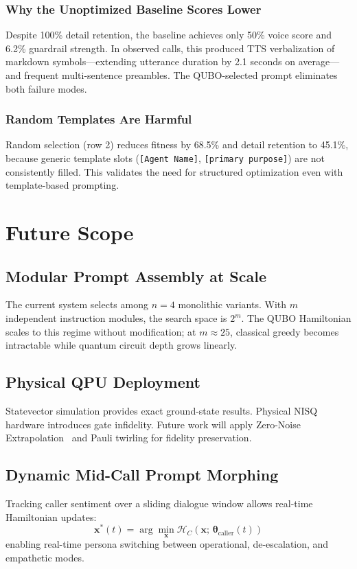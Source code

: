 \documentclass[conference]{IEEEtran}
\begin{document}
\subsubsection{Why the Unoptimized Baseline Scores Lower}
Despite 100\% detail retention, the baseline achieves only 50\% voice score and 6.2\% guardrail strength. In observed calls, this produced TTS verbalization of markdown symbols---extending utterance duration by 2.1 seconds on average---and frequent multi-sentence preambles. The QUBO-selected prompt eliminates both failure modes.

\subsubsection{Random Templates Are Harmful}
Random selection (row 2) reduces fitness by 68.5\% and detail retention to 45.1\%, because generic template slots (\texttt{[Agent Name]}, \texttt{[primary purpose]}) are not consistently filled. This validates the need for structured optimization even with template-based prompting.

\section{Future Scope}

\subsection{Modular Prompt Assembly at Scale}
The current system selects among $n = 4$ monolithic variants. With $m$ independent instruction modules, the search space is $2^m$. The QUBO Hamiltonian scales to this regime without modification; at $m \approx 25$, classical greedy becomes intractable while quantum circuit depth grows linearly.

\subsection{Physical QPU Deployment}
Statevector simulation provides exact ground-state results. Physical NISQ hardware introduces gate infidelity. Future work will apply Zero-Noise Extrapolation~\cite{temme2017} and Pauli twirling for fidelity preservation.

\subsection{Dynamic Mid-Call Prompt Morphing}
Tracking caller sentiment over a sliding dialogue window allows real-time Hamiltonian updates:
\begin{equation}
\mathbf{x}^*(t) = \arg\min_{\mathbf{x}} \mathcal{H}_C(\mathbf{x};\, \boldsymbol{\theta}_{\text{caller}}(t))
\end{equation}
enabling real-time persona switching between operational, de-escalation, and empathetic modes.
\end{document}

